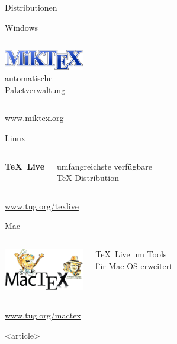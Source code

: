 \begin{Frame}[t]{Distributionen}
  \begin{Block}{Windows}
    \begin{columns}
      \column{1mm}
      \column{5cm}
      \vskip2pt\par
      \includegraphics[width=3.5cm]{images/miktex}\\

      \column{5cm}
      automatische\\ Paketverwaltung
    \end{columns}

    \url{www.miktex.org}
  \end{Block}

  \begin{Block}{Linux}
    \begin{columns}
      \column{1mm}
      \column{5cm}
      \vskip4pt\par
      \textcolor{texlive}{\Huge\bfseries\TeX\ Live}

      \column{5cm}
      umfangreichste verfügbare\\ \TeX{}-Distribution
    \end{columns}

    \url{www.tug.org/texlive}
  \end{Block}

  \begin{Block}{Mac}
    \begin{columns}
      \column{1mm}
      \column{4.5cm}
      \includegraphics[width=3.5cm]{images/mactex}

      \column{5cm}
      \TeX\ Live um Tools\\ für Mac OS erweitert
    \end{columns}

    \url{www.tug.org/mactex}
  \end{Block}
\end{Frame}

\mode
<article>

